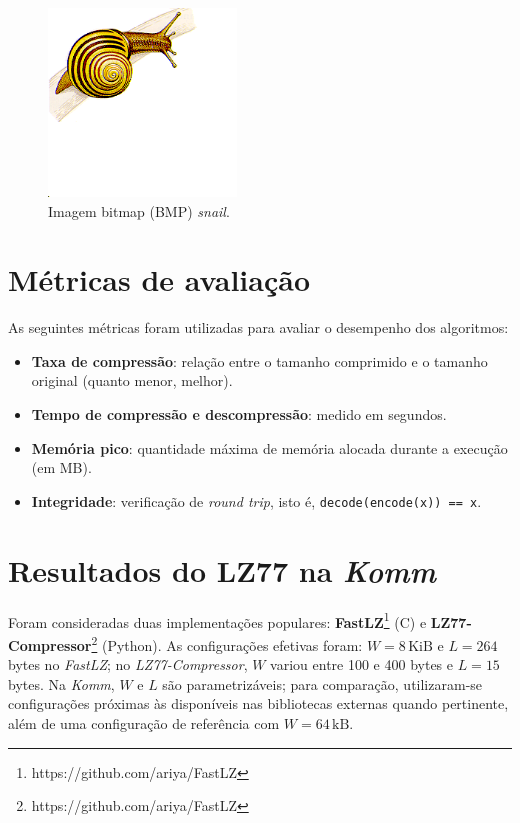 \begin{figure}[h]
  \centering
  \caption{Imagem bitmap (BMP) \textit{snail}.}
  \label{fig:snail}
  \includegraphics[width=5cm]{figuras/snail.png}
\end{figure}

\pagebreak
\section{Métricas de avaliação}

As seguintes métricas foram utilizadas para avaliar o desempenho dos algoritmos:
\begin{itemize}
  \item \textbf{Taxa de compressão}: relação entre o tamanho comprimido e o tamanho original (quanto menor, melhor).
  \item \textbf{Tempo de compressão e descompressão}: medido em segundos.
  \item \textbf{Memória pico}: quantidade máxima de memória alocada durante a execução (em MB).
  \item \textbf{Integridade}: verificação de \emph{round trip}, isto é, \texttt{decode(encode(x)) == x}.
\end{itemize}

\section{Resultados do LZ77 na \textit{Komm}}

Foram consideradas duas implementações populares: \textbf{FastLZ}\footnote{https://github.com/ariya/FastLZ} (C) e \textbf{LZ77-Compressor}\footnote{https://github.com/ariya/FastLZ} (Python). As configurações efetivas foram: \(W=8\,\text{KiB}\) e \(L=264\) bytes no \textit{FastLZ}; no \textit{LZ77-Compressor}, \(W\) variou entre 100 e 400 bytes e \(L=15\) bytes. Na \textit{Komm}, \(W\) e \(L\) são parametrizáveis; para comparação, utilizaram-se configurações próximas às disponíveis nas bibliotecas externas quando pertinente, além de uma configuração de referência com \(W=64\,\text{kB}\).

